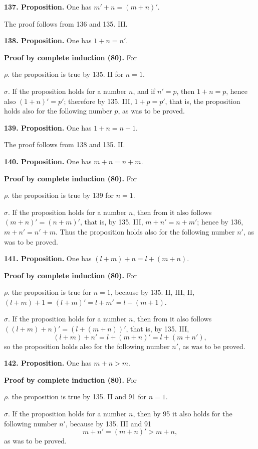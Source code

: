 \documentclass[11pt]{article}
\begin{document}
\noindent\textbf{137. Proposition.} One has $m'+n=(m+n)'$.

The proof follows from 136 and 135. III.

\noindent\textbf{138. Proposition.} One has $1+n=n'$.

\noindent\textbf{Proof by complete induction (80).} For

\noindent $\rho.$ the proposition is true by 135. II for $n=1$.

\noindent $\sigma.$ If the proposition holds for a number $n$, and if $n'=p$, then $1+n=p$, hence also $(1+n)'=p'$; therefore by 135. III, $1+p=p'$, that is, the proposition holds also for the following number $p$, as was to be proved.

\noindent\textbf{139. Proposition.} One has $1+n=n+1$.

The proof follows from 138 and 135. II.

\noindent\textbf{140. Proposition.} One has $m+n=n+m$.

\noindent\textbf{Proof by complete induction (80).} For

\noindent $\rho.$ the proposition is true by 139 for $n=1$.

\noindent $\sigma.$ If the proposition holds for a number $n$, then from it also follows $(m+n)'=(n+m)'$, that is, by 135. III, $m+n'=n+m'$; hence by 136, $m+n'=n'+m$. Thus the proposition holds also for the following number $n'$, as was to be proved.

\noindent\textbf{141. Proposition.} One has $(l+m)+n=l+(m+n)$.

\noindent\textbf{Proof by complete induction (80).} For

\noindent $\rho.$ the proposition is true for $n=1$, because by 135. II, III, II, $(l+m)+1=(l+m)'=l+m'=l+(m+1)$.

\noindent $\sigma.$ If the proposition holds for a number $n$, then from it also follows $((l+m)+n)'=(l+(m+n))'$, that is, by 135. III,
\[
(l+m)+n'=l+(m+n)'=l+(m+n'),
\]
so the proposition holds also for the following number $n'$, as was to be proved.

\noindent\textbf{142. Proposition.} One has $m+n>m$.

\noindent\textbf{Proof by complete induction (80).} For

\noindent $\rho.$ the proposition is true by 135. II and 91 for $n=1$.

\noindent $\sigma.$ If the proposition holds for a number $n$, then by 95 it also holds for the following number $n'$, because by 135. III and 91
\[
m+n'=(m+n)'>m+n,
\]
as was to be proved.
\end{document}
